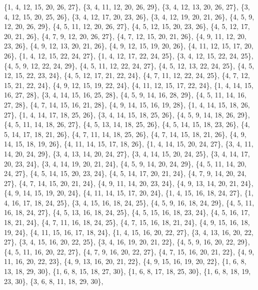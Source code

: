 \documentclass[11pt,a4paper]{article}
\begin{document}
{\{1, 4, 12, 15, 20, 26, 27\}, \{3, 4, 11, 12, 20, 26, 29\}, \{3, 4, 12, 13, 20, 26, 27\}, \{3, 4, 12, 15, 20, 25, 26\}, \{3, 4, 12, 17, 20, 23, 26\},
\{3, 4, 12, 19, 20, 21, 26\}, \{4, 5, 9, 12, 20, 26, 29\}, \{4, 5, 11, 12, 20, 26, 27\}, \{4, 5, 12, 15, 20, 23, 26\}, \{4, 5, 12, 17, 20, 21, 26\},
\{4, 7, 9, 12, 20, 26, 27\}, \{4, 7, 12, 15, 20, 21, 26\}, \{4, 9, 11, 12, 20, 23, 26\}, \{4, 9, 12, 13, 20, 21, 26\}, \{4, 9, 12, 15, 19, 20, 26\},
\{4, 11, 12, 15, 17, 20, 26\}, \{1, 4, 12, 15, 22, 24, 27\}, \{1, 4, 12, 17, 22, 24, 25\}, \{3, 4, 12, 15, 22, 24, 25\}, \{4, 5, 9, 12, 22, 24, 29\},
\{4, 5, 11, 12, 22, 24, 27\}, \{4, 5, 12, 13, 22, 24, 25\}, \{4, 5, 12, 15, 22, 23, 24\}, \{4, 5, 12, 17, 21, 22, 24\}, \{4, 7, 11, 12, 22, 24, 25\},
\{4, 7, 12, 15, 21, 22, 24\}, \{4, 9, 12, 15, 19, 22, 24\}, \{4, 11, 12, 15, 17, 22, 24\}, \{1, 4, 14, 15, 16, 27, 28\}, \{3, 4, 14, 15, 16, 25, 28\},
\{4, 5, 9, 14, 16, 28, 29\}, \{4, 5, 11, 14, 16, 27, 28\}, \{4, 7, 14, 15, 16, 21, 28\}, \{4, 9, 14, 15, 16, 19, 28\}, \{1, 4, 14, 15, 18, 26, 27\},
\{1, 4, 14, 17, 18, 25, 26\}, \{3, 4, 14, 15, 18, 25, 26\}, \{4, 5, 9, 14, 18, 26, 29\}, \{4, 5, 11, 14, 18, 26, 27\}, \{4, 5, 13, 14, 18, 25, 26\},
\{4, 5, 14, 15, 18, 23, 26\}, \{4, 5, 14, 17, 18, 21, 26\}, \{4, 7, 11, 14, 18, 25, 26\}, \{4, 7, 14, 15, 18, 21, 26\}, \{4, 9, 14, 15, 18, 19, 26\},
\{4, 11, 14, 15, 17, 18, 26\}, \{1, 4, 14, 15, 20, 24, 27\}, \{3, 4, 11, 14, 20, 24, 29\}, \{3, 4, 13, 14, 20, 24, 27\}, \{3, 4, 14, 15, 20, 24, 25\},
\{3, 4, 14, 17, 20, 23, 24\}, \{3, 4, 14, 19, 20, 21, 24\}, \{4, 5, 9, 14, 20, 24, 29\}, \{4, 5, 11, 14, 20, 24, 27\}, \{4, 5, 14, 15, 20, 23, 24\},
\{4, 5, 14, 17, 20, 21, 24\}, \{4, 7, 9, 14, 20, 24, 27\}, \{4, 7, 14, 15, 20, 21, 24\}, \{4, 9, 11, 14, 20, 23, 24\}, \{4, 9, 13, 14, 20, 21, 24\},
\{4, 9, 14, 15, 19, 20, 24\}, \{4, 11, 14, 15, 17, 20, 24\}, \{1, 4, 15, 16, 18, 24, 27\}, \{1, 4, 16, 17, 18, 24, 25\}, \{3, 4, 15, 16, 18, 24, 25\},
\{4, 5, 9, 16, 18, 24, 29\}, \{4, 5, 11, 16, 18, 24, 27\}, \{4, 5, 13, 16, 18, 24, 25\}, \{4, 5, 15, 16, 18, 23, 24\}, \{4, 5, 16, 17, 18, 21, 24\},
\{4, 7, 11, 16, 18, 24, 25\}, \{4, 7, 15, 16, 18, 21, 24\}, \{4, 9, 15, 16, 18, 19, 24\}, \{4, 11, 15, 16, 17, 18, 24\}, \{1, 4, 15, 16, 20, 22, 27\},
\{3, 4, 13, 16, 20, 22, 27\}, \{3, 4, 15, 16, 20, 22, 25\}, \{3, 4, 16, 19, 20, 21, 22\}, \{4, 5, 9, 16, 20, 22, 29\}, \{4, 5, 11, 16, 20, 22, 27\},
\{4, 7, 9, 16, 20, 22, 27\}, \{4, 7, 15, 16, 20, 21, 22\}, \{4, 9, 11, 16, 20, 22, 23\}, \{4, 9, 13, 16, 20, 21, 22\}, \{4, 9, 15, 16, 19, 20, 22\},
\{1, 6, 8, 13, 18, 29, 30\}, \{1, 6, 8, 15, 18, 27, 30\}, \{1, 6, 8, 17, 18, 25, 30\}, \{1, 6, 8, 18, 19, 23, 30\}, \{3, 6, 8, 11, 18, 29, 30\},
}
\end{document}
